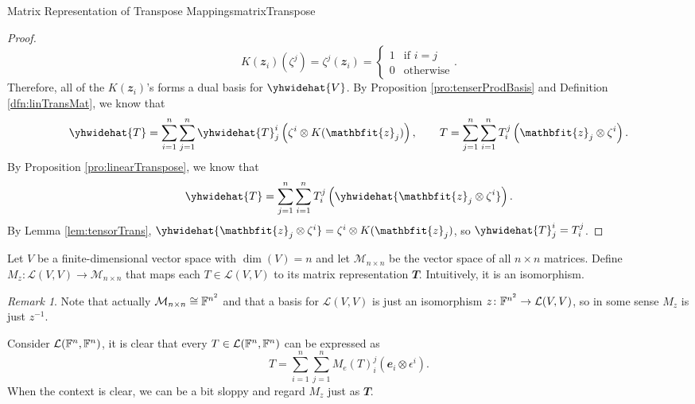 \documentclass[math, code]{amznotes}
\theoremstyle{remark}
\newtheorem*{remark}{Remark}
\begin{document}
\begin{probox}{Matrix Representation of Transpose Mappings}{matrixTranspose}
\begin{proof}
        \begin{equation*}
            K(\mathbfit{z}_i)\left(\zeta^j\right) = \zeta^j(\mathbfit{z}_i) = \begin{cases}
                1 & \textrm{if } i = j \\
                0 & \textrm{otherwise}
            \end{cases}.
        \end{equation*}
        Therefore, all of the $K(\mathbfit{z}_i)$'s forms a dual basis for $\yhwidehat{V}$. By Proposition \ref{pro:tenserProdBasis} and Definition \ref{dfn:linTransMat}, we know that 
        \begin{equation*}
            \yhwidehat{T} = \sum_{i = 1}^{n}\sum_{j = 1}^{n}\yhwidehat{T}^i_j\left(\zeta^i \otimes K(\mathbfit{z}_j)\right), \qquad T = \sum_{j = 1}^{n}\sum_{i = 1}^{n}T^j_i\left(\mathbfit{z}_j \otimes \zeta^i\right).
        \end{equation*}
        By Proposition \ref{pro:linearTranspose}, we know that 
        \begin{equation*}
            \yhwidehat{T} = \sum_{j = 1}^{n}\sum_{i = 1}^{n}T^j_i\left(\yhwidehat{\mathbfit{z}_j \otimes \zeta^i}\right).
        \end{equation*}
        By Lemma \ref{lem:tensorTrans}, $\yhwidehat{\mathbfit{z}_j \otimes \zeta^i} = \zeta^i \otimes K(\mathbfit{z}_j)$, so $\yhwidehat{T}^i_j = T^j_i$. 
    \end{proof}
\end{probox}
Let $V$ be a finite-dimensional vector space with $\dim(V) = n$ and let $\mathcal{M}_{n \times n}$ be the vector space of all $n \times n$ matrices. Define $M_z \colon \mathcal{L}(V, V) \to \mathcal{M}_{n \times n}$ that maps each $T \in \mathcal{L}(V, V)$ to its matrix representation $\mathbfit{T}$. Intuitively, it is an isomorphism.

\begin{notebox}
    \begin{remark}
        Note that actually $\mathcal{M}_{n \times n} \cong \mathbb{F}^{n^2}$ and that a basis for $\mathcal{L}(V, V)$ is just an isomorphism $z \colon \mathbb{F}^{n^2} \to \mathcal{L}(V, V)$, so in some sense $M_z$ is just $z^{-1}$.
    \end{remark}
\end{notebox}

Consider $\mathcal{L}(\mathbb{F}^n, \mathbb{F}^n)$, it is clear that every $T \in \mathcal{L}(\mathbb{F}^n, \mathbb{F}^n)$ can be expressed as
\begin{equation*}
    T = \sum_{i = 1}^{n}\sum_{j = 1}^{n}M_e(T)_i^j\left(\mathbfit{e}_i \otimes \epsilon^i\right).
\end{equation*}
When the context is clear, we can be a bit sloppy and regard $M_z$ just as $\mathbfit{T}$.
\end{document}
